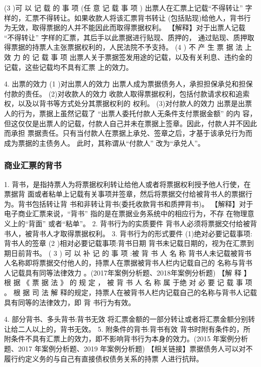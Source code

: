 \documentclass[UTF8,12pt]{ctexart}
\numberwithin{equation}{section} %
\numberwithin{figure}{section}
\numberwithin{table}{section}
\begin{document}
	(3 )可 以 记 载 的 事 项 (任 意 记 载 事 项 )
	出票人在汇票上记载“不得转让” 字样的，汇票不得转让。如果收款人将该汇票背书转让 (包括贴现)给他人，背书行为无效，取得票据的人并不能因此而取得票据权利。
	【解释】对于出票人记载 “不得转让” 字样的汇票，其后手以此票据进行贴现、质押的， 通过贴现、质押取得票据的持票人主张票据权利的，人民法院不予支持。
	(4 ) 不 产 生 票 据 法 上 效 力 的 记 载 事 项 出票人关于票据签发用途的记载，以及有关利息、违约金的记载，这些记载均不具有汇票 上的效力。
	
	4. 出票的效力
	(1 )对出票人的效力
	出票人成为票据债务人，承担担保承兑和担保付款的责任。
	(2)对收款人的效力 收款人取得票据权利，包括付款请求权和追索权，以及以背书等方式处分其票据权利的 权利。
	(3)对付款人的效力
	出票是出票人的行为，票据上虽然记载了 “出票人委托付款人无条件支付票据金额” 的内 容，但这仅仅是出票人的记载，付款人自己并未在票据上签章。因此，付款人并不因此而承担 票据责任。只有当付款人在票据上承兑、签章之后，才基于该承兑行为而成为票据的主债务人。 此时，其称谓从“付款人” 改为“承兑人”。
	
	
	\subsubsection{商业汇票的背书} 
	1. 背书，是指持票人为将票据权利转让给他人或者将票据权利授予他人行使，在票据背 面或者粘单上记载有关事项并签章，然后将票据交付给被背书人的票据行为。背书包括转让背 书和非转让背书(委托收款背书和质押背书)。
	【解释】对于电子商业汇票来说，“背书” 指的是在票据业务系统中的相应行为，不存 在物理意义上的“背面” 或者“粘单”。
	2. 背书行为的实质要件
	背书人必须将票据交付给被背书人，被背书人才取得票据权利。
	3. 背书行为的形式要件
	(1)绝对必要记载事项:背书人的签章
	(2 )相对必要记载事项:背书日期
	背书未记载日期的，视为在汇票到期日前背书。
	( 3 ) 可 以 补 记 的 事 项 :被 背 书 人 名 称 背书人未记载被背书人名称即将票据交付他人的，持票人在票据被背书人栏内记载自己的 名称与背书人记载具有同等法律效力 。(2017年案例分析题、2018年案例分析题)
	【解 释 】 根 据 《 票 据 法 》 的 规 定 ， 被 背 书 人 名 称 属 于绝 对 必 要 记 载 事 项 。 根 据 司 法 解 释的规定，持票人在被背书人栏内记载自己的名称与背书人记载具有同等的法律效力，即 背 书行为有效。
	
	4. 部分背书、多头背书:背书无效 将汇票金额的一部分转让或者将汇票金额分别转让给二人以上的，背书无效。
	5. 附条件的背书:背书有效 背书时附有条件的，所附条件不具有汇票上的效力，即不影响背书行为本身的效力。(2015 年案例分析题、2017 年案例分析题、2019 年案例分析题)
	【相关链接】票据债务人可以对不履行约定义务的与自己有直接债权债务关系的持票 人进行抗辩。
	
\end{document}
